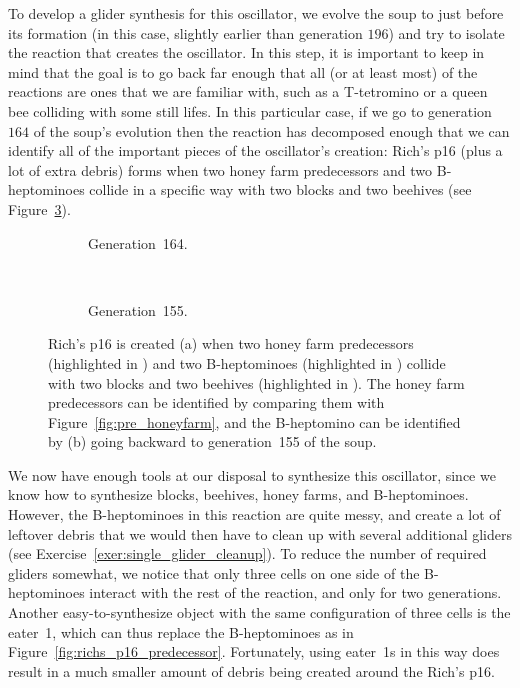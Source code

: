To develop a glider synthesis for this oscillator, we evolve the soup to just before its formation (in this case, slightly earlier than generation $196$) and try to isolate the reaction that creates the oscillator. In this step, it is important to keep in mind that the goal is to go back far enough that all (or at least most) of the reactions are ones that we are familiar with, such as a T-tetromino or a queen bee colliding with some still lifes. In this particular case, if we go to generation $164$ of the soup's evolution then the reaction has decomposed enough that we can identify all of the important pieces of the oscillator's creation: Rich's p16 (plus a lot of extra debris) forms when two honey farm predecessors and two B-heptominoes collide in a specific way with two blocks and two beehives (see Figure~\ref{fig:richs_p16_soup_detailed}).

\begin{figure}[!htb]
	\centering
	\begin{subfigure}{.48\textwidth}
		\centering{}
		\caption{Generation~164.}\label{fig:richs_p16_soup_164}
	\end{subfigure} \ \ \ \ %
	\begin{subfigure}{.48\textwidth}
		\centering{}
		\caption{Generation~155.}
		\label{fig:richs_p16_soup_155}
	\end{subfigure}
	\caption{Rich's p16 is created (a) when two honey farm predecessors (highlighted in ) and two B-heptominoes (highlighted in ) collide with two blocks and two beehives (highlighted in ). The honey farm predecessors can be identified by comparing them with Figure~\ref{fig:pre_honeyfarm}, and the B-heptomino can be identified by (b) going backward to generation~155 of the soup.}\label{fig:richs_p16_soup_detailed}
\end{figure}

We now have enough tools at our disposal to synthesize this oscillator, since we know how to synthesize blocks, beehives, honey farms, and B-heptominoes. However, the B-heptominoes in this reaction are quite messy, and create a lot of leftover debris that we would then have to clean up with several additional gliders (see Exercise~\ref{exer:single_glider_cleanup}). To reduce the number of required gliders somewhat, we notice that only three cells on one side of the B-heptominoes interact with the rest of the reaction, and only for two generations. Another easy-to-synthesize object with the same configuration of three cells is the eater~1, which can thus replace the B-heptominoes as in Figure~\ref{fig:richs_p16_predecessor}. Fortunately, using eater~1s in this way does result in a much smaller amount of debris being created around the Rich's p16.

